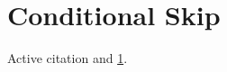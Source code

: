 \documentclass{article}
\begin{document}
\section{Conditional Skip}\label{sec:iffalse}
\iffalse
\cite{fake_if_outer} \label{fake_lbl_if1} {
\iftrue
\cite{fake_if_nested}
\else
\cite{fake_if_nested_else}
\fi
\ifx\relax\relax
\label{fake_lbl_if2}
\fi
\fi
\iffalse \cite{fake_else_branch} { \else \cite{k2} \fi
Active citation \cite{k1} and \ref{sec:iffalse}.


\end{document}
